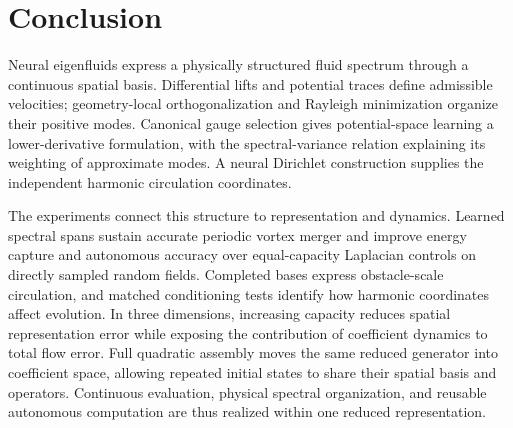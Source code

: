 \section{Conclusion}
\begingroup
Neural eigenfluids express a physically structured fluid spectrum through a continuous spatial basis. Differential lifts and potential traces define admissible velocities; geometry-local orthogonalization and Rayleigh minimization organize their positive modes. Canonical gauge selection gives potential-space learning a lower-derivative formulation, with the spectral-variance relation explaining its weighting of approximate modes. A neural Dirichlet construction supplies the independent harmonic circulation coordinates.

The experiments connect this structure to representation and dynamics. Learned spectral spans sustain accurate periodic vortex merger and improve energy capture and autonomous accuracy over equal-capacity Laplacian controls on directly sampled random fields. Completed bases express obstacle-scale circulation, and matched conditioning tests identify how harmonic coordinates affect evolution. In three dimensions, increasing capacity reduces spatial representation error while exposing the contribution of coefficient dynamics to total flow error. Full quadratic assembly moves the same reduced generator into coefficient space, allowing repeated initial states to share their spatial basis and operators. Continuous evaluation, physical spectral organization, and reusable autonomous computation are thus realized within one reduced representation.
\par\endgroup
